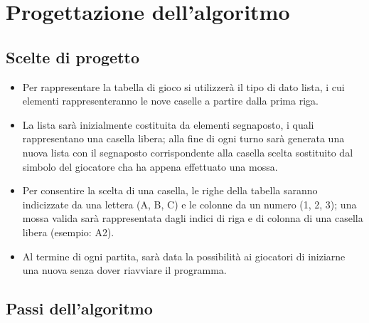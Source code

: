 \documentclass{article}
\begin{document}
\section{Progettazione dell'algoritmo}

\subsection{Scelte di progetto}

\begin{itemize}
    \item Per rappresentare la tabella di gioco si utilizzerà il tipo di dato lista, i cui elementi rappresenteranno le nove caselle a partire dalla prima riga.
    \item La lista sarà inizialmente costituita da elementi segnaposto, i quali rappresentano una casella libera; alla fine di ogni turno sarà generata una nuova lista con il segnaposto corrispondente alla casella scelta sostituito dal simbolo del giocatore cha ha appena effettuato una mossa.
    \item Per consentire la scelta di una casella, le righe della tabella saranno indicizzate da una lettera (A, B, C) e le colonne da un numero (1, 2, 3); una mossa valida sarà rappresentata dagli indici di riga e di colonna di una casella libera (esempio: A2).
    \item Al termine di ogni partita, sarà data la possibilità ai giocatori di iniziarne una nuova senza dover riavviare il programma.
\end{itemize}
\subsection{Passi dell'algoritmo}
\end{document}
